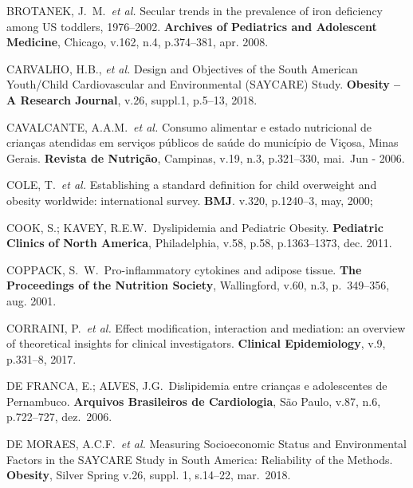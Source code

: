 \noindent BROTANEK, J.\ M.\ \textit{et al.} Secular trends in the prevalence of iron deficiency among US toddlers, 1976–2002. \textbf{Archives of Pediatrics and Adolescent Medicine}, Chicago, v.162, n.4, p.374–381, apr. 2008.


\bigbreak

\noindent CARVALHO, H.B., \textit{et al.} Design and Objectives of the South American Youth/Child Cardiovascular and Environmental (SAYCARE) Study. \textbf{Obesity – A Research Journal}, v.26, suppl.1, p.5--13, 2018.

\bigbreak

\noindent CAVALCANTE, A.A.M.\ \textit{et al.} Consumo alimentar e estado nutricional de crianças atendidas em serviços públicos de saúde do município de Viçosa, Minas Gerais. \textbf{Revista de Nutrição}, Campinas, v.19, n.3, p.321--330, mai.\ Jun - 2006.

\bigbreak

\noindent COLE, T.\ \textit{et al.} Establishing a standard definition for child overweight and obesity worldwide: international survey. \textbf{BMJ}. v.320, p.1240--3, may, 2000; 

\bigbreak

\noindent COOK, S.; KAVEY, R.E.W.\ Dyslipidemia and Pediatric Obesity. \textbf{Pediatric Clinics of North America}, Philadelphia, v.58, p.58, p.1363–1373, dec. 2011.


\bigbreak

\noindent COPPACK, S.\ W.\ Pro-inflammatory cytokines and adipose tissue. \textbf{The Proceedings of the Nutrition Society}, Wallingford, v.60, n.3, p.\ 349--356, aug. 2001.

\bigbreak

\noindent CORRAINI, P.\ \textit{et al.} Effect modification, interaction and mediation: an overview of theoretical insights for clinical investigators. \textbf{Clinical Epidemiology}, v.9, p.331–8, 2017.

\bigbreak

\noindent DE FRANCA, E.; ALVES, J.G.\ Dislipidemia entre crianças e adolescentes de Pernambuco. \textbf{Arquivos Brasileiros de Cardiologia}, São Paulo, v.87, n.6, p.722--727, dez.\ 2006.

\bigbreak

\noindent DE MORAES, A.C.F.\ \textit{et al.} Measuring Socioeconomic Status and Environmental Factors in the SAYCARE Study in South America: Reliability of the Methods. \textbf{Obesity}, Silver Spring v.26, suppl. 1, s.14--22, mar.\ 2018.
\bigbreak

